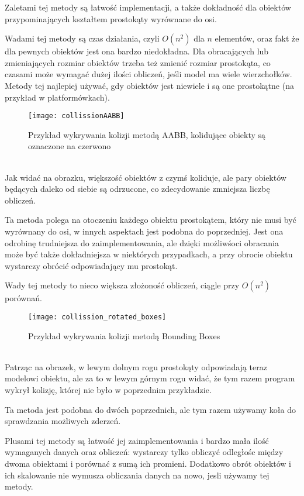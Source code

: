 Zaletami tej metody są łatwo\'sć implementacji, a także dokładno\'sć dla obiektów przypominających kształtem prostokąty wyrównane do osi.

Wadami tej metody są czas działania, czyli $O(n^{2})$ dla $n$ elementów, oraz fakt że dla pewnych obiektów jest ona bardzo niedokładna. Dla obracających lub zmieniających rozmiar obiektów trzeba też zmienić rozmiar prostokąta, co czasami może wymagać dużej ilo\'sci obliczeń, je\'sli model ma wiele wierzchołków.\\
Metody tej najlepiej używać, gdy obiektów jest niewiele i są one prostokątne (na przykład w platformówkach).
\begin{figure}[h]
	\centering
	\noindent\texttt{[image: collissionAABB]}
	\caption{Przykład wykrywania kolizji metodą AABB, kolidujące obiekty są oznaczone na czerwono}
\end{figure}\\
Jak widać na obrazku, większo\'sć obiektów z czym\'s koliduje, ale pary obiektów będących daleko od siebie są odrzucone, co zdecydowanie zmniejsza liczbę obliczeń.
\newpage

\smallskip

Ta metoda polega na otoczeniu każdego obiektu prostokątem, który nie musi być wyrównany do osi, w innych aspektach jest podobna do poprzedniej. Jest ona odrobinę trudniejsza do zaimplementowania, ale dzięki możliw\'soci obracania może być także dokładniejsza w niektórych przypadkach, a przy obrocie obiektu wystarczy obrócić odpowiadający mu prostokąt.

Wady tej metody to nieco większa złożono\'sć obliczeń, ciągle przy $O(n^{2})$ porównań.
\begin{figure}[h]
	\centering
	\noindent\texttt{[image: collission\_rotated\_boxes]}
	\caption{Przykład wykrywania kolizji metodą Bounding Boxes}
\end{figure}\\
Patrząc na obrazek, w lewym dolnym rogu prostokąty odpowiadają teraz modelowi obiektu, ale za to w lewym górnym rogu widać, że tym razem program wykrył kolizję, której nie było w poprzednim przykładzie.
\newpage

\smallskip

Ta metoda jest podobna do dwóch poprzednich, ale tym razem używamy koła do sprawdzania możliwych zderzeń.

Plusami tej metody są łatwo\'sć jej zaimplementowania i bardzo mała ilo\'sć wymaganych danych oraz obliczeń: wystarczy tylko obliczyć odległo\'sc między dwoma obiektami i porównać z sumą ich promieni. Dodatkowo obrót obiektów i ich skalowanie nie wymusza obliczania danych na nowo, jesli używamy tej metody.

